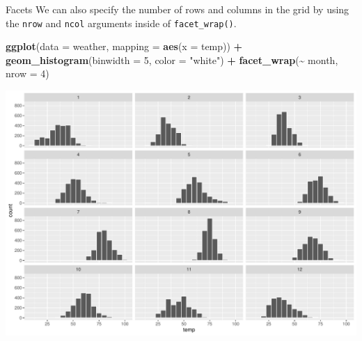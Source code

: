 \documentclass[
  ignorenonframetext,
]{beamer}
\newenvironment{Shaded}{\begin{snugshade}}{\end{snugshade}}
\newcommand{\AttributeTok}[1]{\textcolor[rgb]{0.13,0.29,0.53}{#1}}
\newcommand{\DecValTok}[1]{\textcolor[rgb]{0.00,0.00,0.81}{#1}}
\newcommand{\FunctionTok}[1]{\textcolor[rgb]{0.13,0.29,0.53}{\textbf{#1}}}
\newcommand{\NormalTok}[1]{#1}
\newcommand{\SpecialCharTok}[1]{\textcolor[rgb]{0.81,0.36,0.00}{\textbf{#1}}}
\newcommand{\StringTok}[1]{\textcolor[rgb]{0.31,0.60,0.02}{#1}}
\begin{document}
\begin{frame}[fragile]{Facets}
\protect\hypertarget{facets-2}{}
We can also specify the number of rows and columns in the grid by using
the \texttt{nrow} and \texttt{ncol} arguments inside of
\texttt{facet\_wrap()}.

\tiny

\begin{Shaded}
\begin{Highlighting}[]
\FunctionTok{ggplot}\NormalTok{(}\AttributeTok{data =}\NormalTok{ weather, }\AttributeTok{mapping =} \FunctionTok{aes}\NormalTok{(}\AttributeTok{x =}\NormalTok{ temp)) }\SpecialCharTok{+}
  \FunctionTok{geom\_histogram}\NormalTok{(}\AttributeTok{binwidth =} \DecValTok{5}\NormalTok{, }\AttributeTok{color =} \StringTok{"white"}\NormalTok{) }\SpecialCharTok{+}
  \FunctionTok{facet\_wrap}\NormalTok{(}\SpecialCharTok{\textasciitilde{}}\NormalTok{ month, }\AttributeTok{nrow =} \DecValTok{4}\NormalTok{)}
\end{Highlighting}
\end{Shaded}

\begin{center}\includegraphics[width=0.7\linewidth,height=0.6\textheight]{Week2_Lect_files/figure-beamer/unnamed-chunk-32-1} \end{center}
\normalsize
\end{frame}
\end{document}
